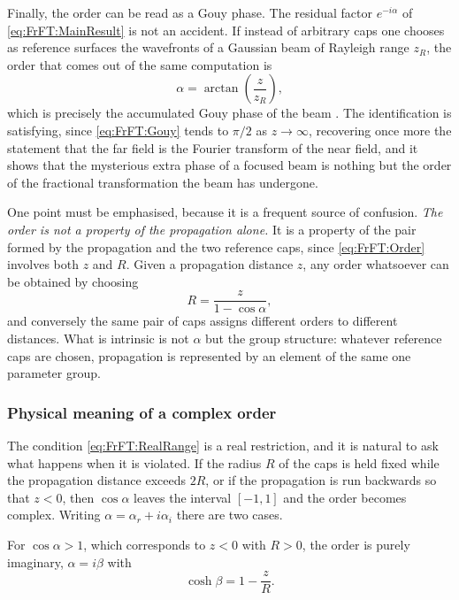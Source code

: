 			Finally, the order can be read as a Gouy phase. The residual factor $e^{-i\alpha}$ of \eqref{eq:FrFT:MainResult} is not an accident. If instead of arbitrary caps one chooses as reference surfaces the wavefronts of a Gaussian beam of Rayleigh range $z_{R}$, the order that comes out of the same computation is
			\begin{equation}\label{eq:FrFT:Gouy}
				\alpha = \arctan\!\left(\frac{z}{z_{R}}\right),
			\end{equation}
			which is precisely the accumulated Gouy phase of the beam \citep{ozaktas1995fractional}. The identification is satisfying, since \eqref{eq:FrFT:Gouy} tends to $\pi/2$ as $z\to\infty$, recovering once more the statement that the far field is the Fourier transform of the near field, and it shows that the mysterious extra phase of a focused beam is nothing but the order of the fractional transformation the beam has undergone.

			One point must be emphasised, because it is a frequent source of confusion. \textit{The order is not a property of the propagation alone.} It is a property of the pair formed by the propagation and the two reference caps, since \eqref{eq:FrFT:Order} involves both $z$ and $R$. Given a propagation distance $z$, any order whatsoever can be obtained by choosing
			\begin{equation}\label{eq:FrFT:ChooseR}
				R = \frac{z}{1-\cos\alpha},
			\end{equation}
			and conversely the same pair of caps assigns different orders to different distances. What is intrinsic is not $\alpha$ but the group structure: whatever reference caps are chosen, propagation is represented by an element of the same one parameter group.

		\subsubsection{Physical meaning of a complex order}

			The condition \eqref{eq:FrFT:RealRange} is a real restriction, and it is natural to ask what happens when it is violated. If the radius $R$ of the caps is held fixed while the propagation distance exceeds $2R$, or if the propagation is run backwards so that $z<0$, then $\cos\alpha$ leaves the interval $[-1,1]$ and the order becomes complex. Writing $\alpha = \alpha_{r} + i\alpha_{i}$ there are two cases.

			For $\cos\alpha > 1$, which corresponds to $z<0$ with $R>0$, the order is purely imaginary, $\alpha = i\beta$ with
			\begin{equation}\label{eq:FrFT:ImagOrder}
				\cosh\beta = 1 - \frac{z}{R}.
			\end{equation}

